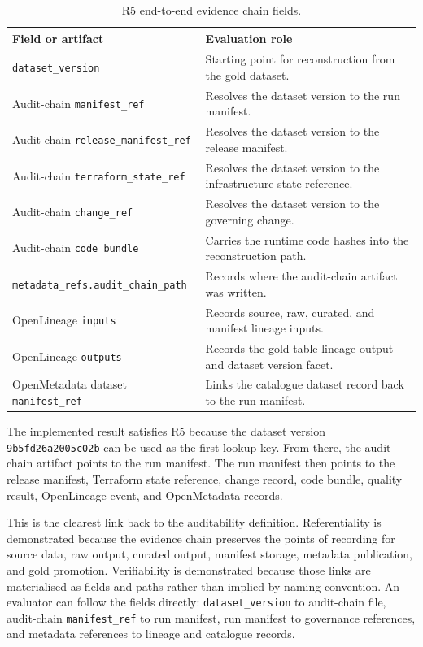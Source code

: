 \begin{table}[H]
  \centering
  \caption{R5 end-to-end evidence chain fields.}
  \label{tab:evaluation-r5-fields}
  \renewcommand{\arraystretch}{1.15}
  \begin{tabularx}{\textwidth}{@{}p{}X@{}}
    \toprule
    \textbf{Field or artifact} & \textbf{Evaluation role} \\
    \midrule
    \texttt{dataset\_version} & Starting point for reconstruction from the gold dataset. \\
    Audit-chain \texttt{manifest\_ref} & Resolves the dataset version to the run manifest. \\
    Audit-chain \texttt{release\_manifest\_ref} & Resolves the dataset version to the release manifest. \\
    Audit-chain \texttt{terraform\_state\_ref} & Resolves the dataset version to the infrastructure state reference. \\
    Audit-chain \texttt{change\_ref} & Resolves the dataset version to the governing change. \\
    Audit-chain \texttt{code\_bundle} & Carries the runtime code hashes into the reconstruction path. \\
    \texttt{metadata\_refs.audit\_chain\_path} & Records where the audit-chain artifact was written. \\
    OpenLineage \texttt{inputs} & Records source, raw, curated, and manifest lineage inputs. \\
    OpenLineage \texttt{outputs} & Records the gold-table lineage output and dataset version facet. \\
    OpenMetadata dataset \texttt{manifest\_ref} & Links the catalogue dataset record back to the run manifest. \\
    \bottomrule
  \end{tabularx}
\end{table}

The implemented result satisfies R5 because the dataset version
\texttt{9b5fd26a2005c02b} can be used as the first lookup key. From there, the
audit-chain artifact points to the run manifest. The run manifest then points
to the release manifest, Terraform state reference, change record, code bundle,
quality result, OpenLineage event, and OpenMetadata records.

This is the clearest link back to the auditability definition. Referentiality
is demonstrated because the evidence chain preserves the points of recording
for source data, raw output, curated output, manifest storage, metadata
publication, and gold promotion. Verifiability is demonstrated because those
links are materialised as fields and paths rather than implied by naming
convention. An evaluator can follow the fields directly:
\texttt{dataset\_version} to audit-chain file, audit-chain
\texttt{manifest\_ref} to run manifest, run manifest to governance references,
and metadata references to lineage and catalogue records.


